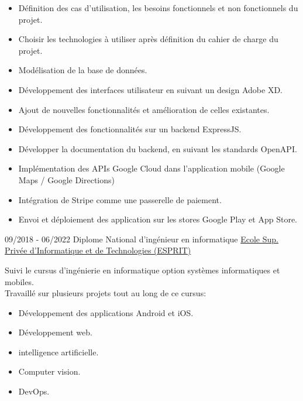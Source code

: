 \documentclass[9pt]{developercv} %
\begin{document}
\begin{entrylist}
{        \begin{itemize}[noitemsep,topsep=0pt,parsep=0pt,partopsep=0pt, leftmargin=-1pt]
            \item Définition des cas d'utilisation, les besoins fonctionnels et non fonctionnels du projet.
            \item Choisir les technologies à utiliser après définition du cahier de charge du projet.
            \item Modélisation de la base de données.
            \item Développement des interfaces utilisateur en suivant un design Adobe XD.
            \item Ajout de nouvelles fonctionnalités et amélioration de celles existantes.
            \item Développement des fonctionnalités sur un backend ExpressJS.
            \item Développer la documentation du backend, en suivant les standards OpenAPI.
            \item Implémentation des APIs Google Cloud dans l'application mobile (Google Maps / Google Directions)
            \item Intégration de Stripe comme une passerelle de paiement.
            \item Envoi et déploiement des application sur les stores Google Play et App Store.
        \end{itemize}
        }
\end{entrylist}

\vspace{-10 pt}
\begin{entrylist}
    \entry
    {09/2018 - 06/2022}
    {Diplome National d'ingénieur en informatique}
    {\href{https://www.esprit.tn}{Ecole Sup. Privée d'Informatique et de Technologies (ESPRIT)}}
    {Suivi le cursus d'ingénierie en informatique option systèmes informatiques et mobiles.\\Travaillé sur plusieurs projets tout au long de ce cursus:
        \begin{itemize}[noitemsep,topsep=0pt,parsep=0pt,partopsep=0pt, leftmargin=0pt]
            \item Développement des applications Android et iOS.
            \item Développement web.
            \item intelligence artificielle.
            \item Computer vision.
            \item DevOps.
        \end{itemize}
    }
\end{entrylist}
\end{document}
